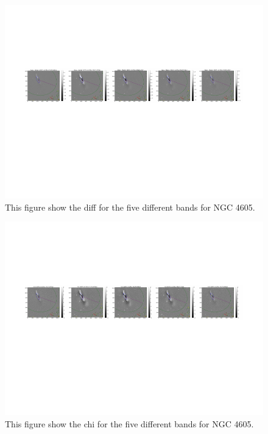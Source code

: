 \documentclass[12pt,preprint,pdftex]{aastex}
\begin{document}
\begin{figure}
\centering
\includegraphics[trim = .9cm 4.5cm 0cm 2.9cm,clip=true,width=\textwidth] {goodsingle-colors-diff.pdf}
\caption{This figure show the diff for the five different bands for NGC 4605.}
\label{fig:colorsdiff}
\end{figure}

\begin{figure}
\centering
\includegraphics[trim = .9cm 4.5cm 0cm 2.9cm,clip=true,width=\textwidth] {goodsingle-colors-chi.pdf}
\caption{This figure show the chi for the five different bands for NGC 4605.}
\label{fig:colorschi}
\end{figure}
\end{document}
